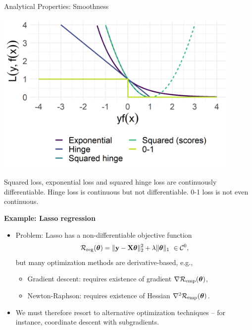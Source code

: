 \documentclass[11pt,compress,t,notes=noshow, xcolor=table]{beamer}
\begin{document}
\begin{vbframe}{Analytical Properties: Smoothness}
\begin{minipage}[c]{0.4\textwidth}
  \includegraphics[width=0.9\textwidth]{figure/plot_loss_overview_classif}
\end{minipage}%
\begin{minipage}[c]{0.05\textwidth}
  \phantom{foo}
\end{minipage}%
\begin{minipage}[c]{0.55\textwidth}
  \footnotesize \raggedright
  Squared loss, exponential loss and squared hinge loss are continuously 
  differentiable. Hinge loss is continuous but not differentiable. 
  0-1 loss is not even continuous.
\end{minipage}%

\framebreak

\small
\textbf{Example: Lasso regression}

\begin{itemize}
  \small
  \item Problem: Lasso has a non-differentiable 
  objective function $$\mathcal{R}_{\text{reg}}(\bm{\theta}) = \| \mathbf{y} - \mathbf{X} \bm{\theta} \|^2_2
  + \lambda \| \bm{\theta} \|_1 ~ \in \mathcal{C}^0,$$
  but many optimization methods are derivative-based, e.g.,
  \begin{itemize}
    \small
    \item Gradient descent: requires existence of gradient $\nabla \mathcal{R}_{\text{emp}}(\bm{\theta})$, 
    \item Newton-Raphson: requires existence of Hessian $\nabla^2 \mathcal{R}_{\text{emp}}(\bm{\theta})$.
  \end{itemize}
  \item We must therefore resort to alternative optimization 
  techniques -- for instance, coordinate descent with subgradients.
\end{itemize}

\vfill


\end{vbframe}
\end{document}
